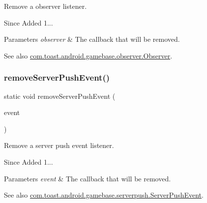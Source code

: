 Remove a observer listener. 

\begin{DoxySince}{Since}
Added 1... 
\end{DoxySince}

\begin{DoxyParams}{Parameters}
{\em observer} & The callback that will be removed. \\
\hline
\end{DoxyParams}
\begin{DoxySeeAlso}{See also}
\hyperlink{interfacecom_1_1toast_1_1android_1_1gamebase_1_1observer_1_1_observer}{com.\+toast.\+android.\+gamebase.\+observer.\+Observer}. 
\end{DoxySeeAlso}
\mbox{\label{classcom_1_1toast_1_1android_1_1gamebase_1_1_gamebase_a1aac5aefec7eee16ab9ca5522c19dd75}} 
\subsubsection{\texorpdfstring{remove\+Server\+Push\+Event()}{removeServerPushEvent()}}
{\footnotesize\ttfamily static void remove\+Server\+Push\+Event (\begin{DoxyParamCaption}\item[{\hyperlink{interfacecom_1_1toast_1_1android_1_1gamebase_1_1serverpush_1_1_server_push_event}{Server\+Push\+Event}}]{event }\end{DoxyParamCaption})\hspace{0.3cm}{\ttfamily [static]}}



Remove a server push event listener. 

\begin{DoxySince}{Since}
Added 1... 
\end{DoxySince}

\begin{DoxyParams}{Parameters}
{\em event} & The callback that will be removed. \\
\hline
\end{DoxyParams}
\begin{DoxySeeAlso}{See also}
\hyperlink{interfacecom_1_1toast_1_1android_1_1gamebase_1_1serverpush_1_1_server_push_event}{com.\+toast.\+android.\+gamebase.\+serverpush.\+Server\+Push\+Event}. 
\end{DoxySeeAlso}
\mbox{\label{classcom_1_1toast_1_1android_1_1gamebase_1_1_gamebase_a497299e85574df22a08a7daf1f032ff3}} 
